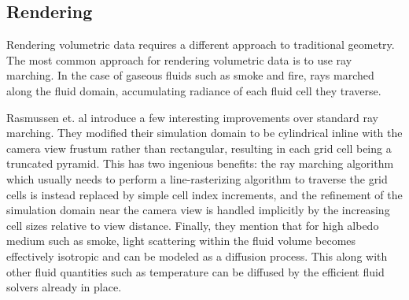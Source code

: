 \documentclass[a4paper, 11pt, titlepage]{article}
\begin{document}
\subsection{Rendering}
Rendering volumetric data requires a different approach to traditional geometry.
The most common approach for rendering volumetric data is to use ray marching.
In the case of gaseous fluids such as smoke and fire, rays marched along the
fluid domain, accumulating radiance of each fluid cell they traverse.

Rasmussen et. al \cite{rasmussen2003smoke} introduce a few interesting
improvements over standard ray marching. They modified their simulation domain
to be cylindrical inline with the camera view frustum rather than rectangular,
resulting in each grid cell being a truncated pyramid. This has two ingenious benefits:
the ray marching algorithm which usually needs to perform a line-rasterizing
algorithm to traverse the grid cells is instead replaced by
simple cell index increments, and the refinement of the simulation domain near
the camera view is handled implicitly by the increasing cell sizes relative to
view distance. Finally, they mention that for high albedo medium such as smoke,
light scattering within the fluid volume becomes effectively isotropic and can be
modeled as a diffusion process. This along with other fluid quantities such as
temperature can be diffused by the efficient fluid solvers already in place.
\end{document}
